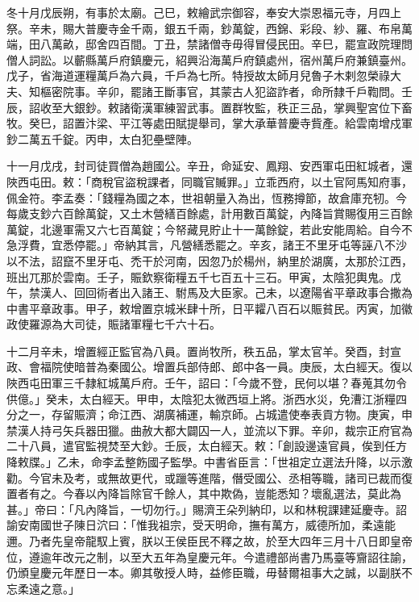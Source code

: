 \begin{pinyinscope}
 冬十月戊辰朔，有事於太廟。己巳，敕繪武宗御容，奉安大崇恩福元寺，月四上祭。辛未，賜大普慶寺金千兩，銀五千兩，鈔萬錠，西錦、彩段、紗、羅、布帛萬端，田八萬畝，邸舍四百間。丁丑，禁諸僧寺毋得冒侵民田。辛巳，罷宣政院理問僧人詞訟。以蘄縣萬戶府鎮慶元，紹興沿海萬戶府鎮處州，宿州萬戶府兼鎮臺州。戊子，省海道運糧萬戶為六員，千戶為七所。特授故太師月兒魯子木剌忽榮祿大夫、知樞密院事。辛卯，罷諸王斷事官，其蒙古人犯盜詐者，命所隸千戶鞫問。壬辰，詔收至大銀鈔。敕諸衛漢軍練習武事。置群牧監，秩正三品，掌興聖宮位下畜牧。癸巳，詔置汴梁、平江等處田賦提舉司，掌大承華普慶寺貲產。給雲南增戍軍鈔二萬五千錠。丙申，太白犯壘壁陣。



 十一月戊戌，封司徒買僧為趙國公。辛丑，命延安、鳳翔、安西軍屯田紅城者，還陜西屯田。敕：「商稅官盜稅課者，同職官贓罪。」立乖西府，以土官阿馬知府事，佩金符。李孟奏：「錢糧為國之本，世祖朝量入為出，恆務撙節，故倉庫充牣。今每歲支鈔六百餘萬錠，又土木營繕百餘處，計用數百萬錠，內降旨賞賜復用三百餘萬錠，北邊軍需又六七百萬錠；今帑藏見貯止十一萬餘錠，若此安能周給。自今不急浮費，宜悉停罷。」帝納其言，凡營繕悉罷之。辛亥，諸王不里牙屯等誣八不沙以不法，詔竄不里牙屯、禿干於河南，因忽乃於楊州，納里於湖廣，太那於江西，班出兀那於雲南。壬子，賑欽察衛糧五千七百五十三石。甲寅，太陰犯輿鬼。戊午，禁漢人、回回術者出入諸王、駙馬及大臣家。己未，以遼陽省平章政事合撒為中書平章政事。甲子，敕增置京城米肆十所，日平糶八百石以賑貧民。丙寅，加徽政使羅源為大司徒，賑諸軍糧七千六十石。



 十二月辛未，增置經正監官為八員。置尚牧所，秩五品，掌太官羊。癸酉，封宣政、會福院使暗普為秦國公。增置兵部侍郎、郎中各一員。庚辰，太白經天。復以陜西屯田軍三千隸紅城萬戶府。壬午，詔曰：「今歲不登，民何以堪？春蒐其勿令供億。」癸未，太白經天。甲申，太陰犯太微西垣上將。浙西水災，免漕江浙糧四分之一，存留賑濟；命江西、湖廣補運，輸京師。占城遣使奉表貢方物。庚寅，申禁漢人持弓矢兵器田獵。曲赦大都大闢囚一人，並流以下罪。辛卯，裁宗正府官為二十八員，遣官監視焚至大鈔。壬辰，太白經天。敕：「創設邊遠官員，俟到任方降敕牒。」乙未，命李孟整飭國子監學。中書省臣言：「世祖定立選法升降，以示激勸。今官未及考，或無故更代，或躐等進階，僭受國公、丞相等職，諸司已裁而復置者有之。今春以內降旨除官千餘人，其中欺偽，豈能悉知？壞亂選法，莫此為甚。」帝曰：「凡內降旨，一切勿行。」賜濟王朵列納印，以和林稅課建延慶寺。詔諭安南國世子陳日泬曰：「惟我祖宗，受天明命，撫有萬方，威德所加，柔遠能邇。乃者先皇帝龍馭上賓，朕以王侯臣民不釋之故，於至大四年三月十八日即皇帝位，遵逾年改元之制，以至大五年為皇慶元年。今遣禮部尚書乃馬臺等齎詔往諭，仍頒皇慶元年歷日一本。卿其敬授人時，益修臣職，毋替爾祖事大之誠，以副朕不忘柔遠之意。」




\end{pinyinscope}

